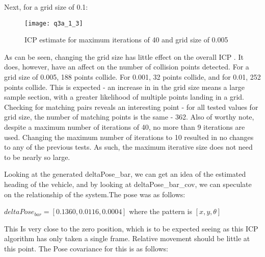 		\newline	
		\pagebreak	
		Next, for a grid size of 0.1:\newline
		
			\begin{figure}[position = here]
				\begin{centering}
					\texttt{[image: q3a\_1\_3]}\\
					\caption[\textit{RPYAxes}]{ICP estimate for maximum iterations of 40 and grid size of 0.005}
				\end{centering}
			\end{figure}
			
		\newline As can be seen, changing the grid size has little effect on the overall ICP . \newline It does, however, have an affect on the number of collision points detected. For a grid size of 0.005, 188 points collide. For 0.001, 32 points collide, and for 0.01, 252 points collide. This is expected - an increase in in the grid size means a large sample section, with a greater likelihood of multiple points landing in a grid.\newline \newline
		Checking for matching pairs reveals an interesting point - for all tested values for grid size, the number of matching points is the same - 362. Also of worthy note, despite a maximum number of iterations of 40, no more than 9 iterations are used. Changing the maximum number of iterations to 10 resulted in no changes to any of the previous tests. As such, the maximum iterative size does not need to be nearly so large.\newline \newline
		
		Looking at the generated deltaPose_bar, we can get an idea of the estimated heading of the vehicle, and by looking at deltaPose_bar_cov, we can speculate on the relationship of the system.\newline The pose was as follows:\newline \newline
		
			${deltaPose_{bar} = [0.1360,	0.0116,	 0.0004]}$ where the pattern is ${[x,y, \theta]}$
		
		\newline This Is very close to the zero position, which is to be expected seeing as this ICP algorithm has only taken a single frame. Relative movement should be little at this point.\newline
		The Pose covariance for this is as follows:\newline
		
